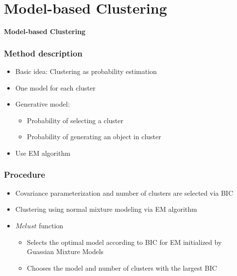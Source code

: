 \documentclass{beamer}
\begin{document}

\section{Model-based Clustering}
\begin{frame}
\begin{center}
\textbf{Model-based Clustering}
\end{center} 
\end{frame}
\begin{frame}
\frametitle{Method description}
\begin{center}
 \begin{itemize}
 \item Basic idea: Clustering as probability estimation
\item One model for each cluster
\item Generative model:
\begin{itemize}
\item Probability of selecting a cluster
\item Probability of generating an object in cluster
\end{itemize}
\item Use EM algorithm


 \end{itemize}
\end{center}
\end{frame}








\begin{frame}
\frametitle{Procedure}
\begin{center}
\begin{itemize}
\item Covariance parameterization and number of clusters are selected via BIC
\item Clustering using normal mixture modeling via EM algorithm
\item $Mclust$ function 
\begin{itemize}
\item Selects the optimal model according to BIC for EM initialized by Guassian Mixture Models
\item Chooses the model and number of clusters with the largest BIC

\end{itemize}
\end{itemize}
  
\end{center}
\end{frame}
\end{document}
